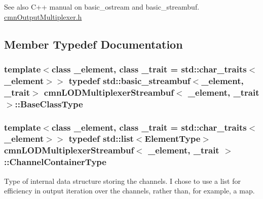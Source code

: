 \begin{DoxySeeAlso}{See also}
C++ manual on basic\+\_\+ostream and basic\+\_\+streambuf. \hyperlink{cmn_output_multiplexer_8h}{cmn\+Output\+Multiplexer.\+h} 
\end{DoxySeeAlso}


\subsection{Member Typedef Documentation}
\hypertarget{classcmn_l_o_d_multiplexer_streambuf_acd1cdcc6f9f1607317e5ec459b67da37}{}
\subsubsection[{Base\+Class\+Type}]{\setlength{\rightskip}{0pt plus 5cm}template$<$class \+\_\+element, class \+\_\+trait = std\+::char\+\_\+traits$<$\+\_\+element$>$$>$ typedef std\+::basic\+\_\+streambuf$<$\+\_\+element, \+\_\+trait$>$ {\bf cmn\+L\+O\+D\+Multiplexer\+Streambuf}$<$ \+\_\+element, \+\_\+trait $>$\+::{\bf Base\+Class\+Type}}\label{classcmn_l_o_d_multiplexer_streambuf_acd1cdcc6f9f1607317e5ec459b67da37}
\hypertarget{classcmn_l_o_d_multiplexer_streambuf_a2fd9fe59de3be9b8cf5546ac2b0e41bb}{}
\subsubsection[{Channel\+Container\+Type}]{\setlength{\rightskip}{0pt plus 5cm}template$<$class \+\_\+element, class \+\_\+trait = std\+::char\+\_\+traits$<$\+\_\+element$>$$>$ typedef std\+::list$<${\bf Element\+Type}$>$ {\bf cmn\+L\+O\+D\+Multiplexer\+Streambuf}$<$ \+\_\+element, \+\_\+trait $>$\+::{\bf Channel\+Container\+Type}}\label{classcmn_l_o_d_multiplexer_streambuf_a2fd9fe59de3be9b8cf5546ac2b0e41bb}
Type of internal data structure storing the channels. I chose to use a list for efficiency in output iteration over the channels, rather than, for example, a map. \hypertarget{classcmn_l_o_d_multiplexer_streambuf_aa3b0347701c1aa5157a719978a1a6386}{}
